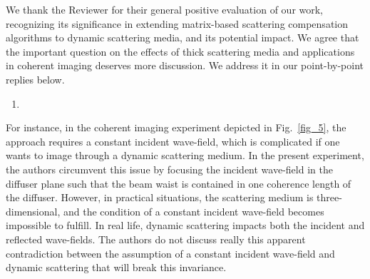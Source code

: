 \documentclass[12pt]{article}
\newenvironment{solved_reviewercomment}
    {\begin{tcolorbox}[width=\linewidth,colback=gray!5,colframe=solved_commentcolor!50,title=Reviewer Comment,left=5pt,right=5pt]}
    {\end{tcolorbox}}
\newenvironment{finished_ourresponse}
    {\begin{tcolorbox}[width=\linewidth,breakable,enhanced,colback=gray!5,colframe=finished_responsecolor!50,title=Response,left=5pt,right=5pt]}
    {\end{tcolorbox}}
\begin{document}
\begin{finished_ourresponse}
    
    We thank the Reviewer for their general positive evaluation of our work, recognizing its significance in extending matrix-based scattering compensation algorithms to dynamic scattering media, and its potential impact.
    We agree that the important question on the effects of thick scattering media and applications in coherent imaging deserves more discussion. We address it in our point-by-point replies below.
\end{finished_ourresponse}


\begin{enumerate}[label=\arabic*.]
\item \leavevmode
\end{enumerate}
\vspace{-1em}
\begin{solved_reviewercomment}
    For instance, in the coherent imaging experiment depicted in Fig.~\ref{fig_5}, the approach requires a constant incident wave-field, which is complicated if one wants to image through a dynamic scattering medium. In the present experiment, the authors circumvent this issue by focusing the incident wave-field in the diffuser plane such that the beam waist is contained in one coherence length of the diffuser. However, in practical situations, the scattering medium is three-dimensional, and the condition of a constant incident wave-field becomes impossible to fulfill. In real life, dynamic scattering impacts both the incident and reflected wave-fields. The authors do not discuss really this apparent contradiction between the assumption of a constant incident wave-field and dynamic scattering that will break this invariance.
\end{solved_reviewercomment}
\end{document}
